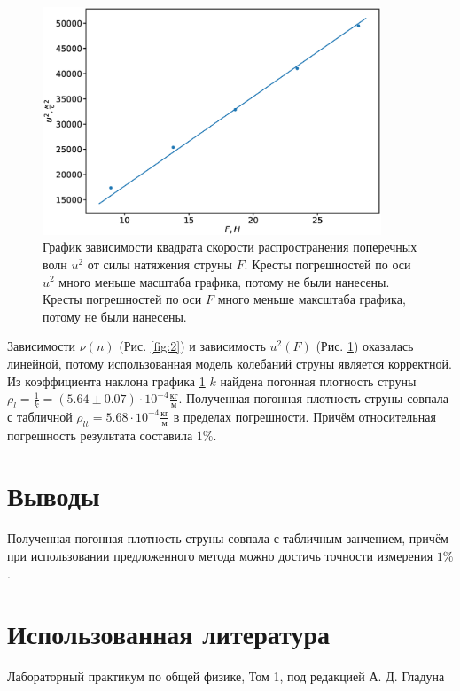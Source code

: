 \documentclass[12pt]{article}
\begin{document}
\begin{figure}[H]
    \begin{center}
        \includegraphics[width=0.9\textwidth]{gr.eps}
    \end{center}
    \caption{График зависимости квадрата скорости распространения поперечных волн $u^2$ от силы натяжения струны $F$. Кресты погрешностей
        по оси $u^2$ много меньше масштаба графика, потому не были нанесены. Кресты погрешностей по оси $F$ много меньше максштаба графика, 
        потому не были нанесены.}
    \label{fig:3}
\end{figure}
Зависимости $\nu(n)$ (Рис. \ref{fig:2}) и зависимость $u^2(F)$ (Рис. \ref{fig:3}) оказалась линейной, потому использованная модель колебаний 
струны является корректной. Из коэффициента наклона графика \ref{fig:3} $k$ найдена погонная плотность струны 
$\rho_l = \frac{1}{k} = (5.64 \pm 0.07) \cdot 10^{-4} \frac{\textrm{кг}}{\textrm{м}}$. Полученная погонная плотность струны совпала с табличной
$\rho_{lt} = 5.68 \cdot 10^{-4} \frac{\textrm{кг}}{\textrm{м}}$ в пределах погрешности. Причём относительная погрешность результата составила $1\%$.

\section{Выводы}
Полученная погонная плотность струны совпала с табличным занчением, причём при использовании предложенного метода можно достичь точности измерения
$1\%$.

\section{Использованная литература}
\begin{thebibliography}{9}
    Лабораторный практикум по общей физике, Том 1, под редакцией А. Д. Гладуна
\end{thebibliography}
\end{document}
